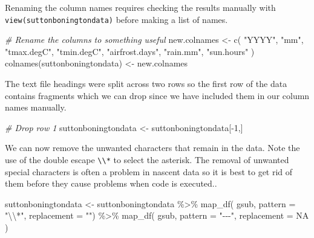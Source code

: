 \documentclass{article}
\newenvironment{Shaded}{\begin{snugshade}}{\end{snugshade}}
\newcommand{\AttributeTok}[1]{\textcolor[rgb]{0.77,0.63,0.00}{#1}}
\newcommand{\CommentTok}[1]{\textcolor[rgb]{0.56,0.35,0.01}{\textit{#1}}}
\newcommand{\ConstantTok}[1]{\textcolor[rgb]{0.00,0.00,0.00}{#1}}
\newcommand{\DecValTok}[1]{\textcolor[rgb]{0.00,0.00,0.81}{#1}}
\newcommand{\FunctionTok}[1]{\textcolor[rgb]{0.00,0.00,0.00}{#1}}
\newcommand{\NormalTok}[1]{#1}
\newcommand{\OtherTok}[1]{\textcolor[rgb]{0.56,0.35,0.01}{#1}}
\newcommand{\SpecialCharTok}[1]{\textcolor[rgb]{0.00,0.00,0.00}{#1}}
\newcommand{\StringTok}[1]{\textcolor[rgb]{0.31,0.60,0.02}{#1}}
\begin{document}
Renaming the column names requires checking the results manually with \texttt{view(suttonboningtondata)} before making a list of names.

\begin{Shaded}
\begin{Highlighting}[]
\CommentTok{\# Rename the columns to something useful}
\NormalTok{new.colnames }\OtherTok{\textless{}{-}} \FunctionTok{c}\NormalTok{( }\StringTok{"YYYY"}\NormalTok{,}
                   \StringTok{"mm"}\NormalTok{,}
                   \StringTok{"tmax.degC"}\NormalTok{,}
                   \StringTok{"tmin.degC"}\NormalTok{,}
                   \StringTok{"airfrost.days"}\NormalTok{,}
                   \StringTok{"rain.mm"}\NormalTok{,}
                   \StringTok{"sun.hours"}
\NormalTok{  )}
\FunctionTok{colnames}\NormalTok{(suttonboningtondata) }\OtherTok{\textless{}{-}}\NormalTok{ new.colnames}
\end{Highlighting}
\end{Shaded}

The text file headings were split across two rows so the first row of the data contains fragments which we can drop since we have included them in our column names manually.

\begin{Shaded}
\begin{Highlighting}[]
\CommentTok{\# Drop row 1}
\NormalTok{suttonboningtondata }\OtherTok{\textless{}{-}}\NormalTok{ suttonboningtondata[}\SpecialCharTok{{-}}\DecValTok{1}\NormalTok{,]}
\end{Highlighting}
\end{Shaded}

We can now remove the unwanted characters that remain in the data. Note the use of the double escape \texttt{\textbackslash{}\textbackslash{}*} to select the asterisk. The removal of unwanted special characters is often a problem in nascent data so it is best to get rid of them before they cause problems when code is executed..

\begin{Shaded}
\begin{Highlighting}[]
\NormalTok{suttonboningtondata }\OtherTok{\textless{}{-}}\NormalTok{ suttonboningtondata }\SpecialCharTok{\%\textgreater{}\%}
                        \FunctionTok{map\_df}\NormalTok{( gsub,}
                                \AttributeTok{pattern =} \StringTok{"}\SpecialCharTok{\textbackslash{}\textbackslash{}}\StringTok{*"}\NormalTok{,}
                                \AttributeTok{replacement =} \StringTok{""}\NormalTok{) }\SpecialCharTok{\%\textgreater{}\%}
                        \FunctionTok{map\_df}\NormalTok{( gsub,}
                                \AttributeTok{pattern =} \StringTok{"{-}{-}{-}"}\NormalTok{,}
                                \AttributeTok{replacement =} \ConstantTok{NA}
\NormalTok{                                )}
\end{Highlighting}
\end{Shaded}
\end{document}
